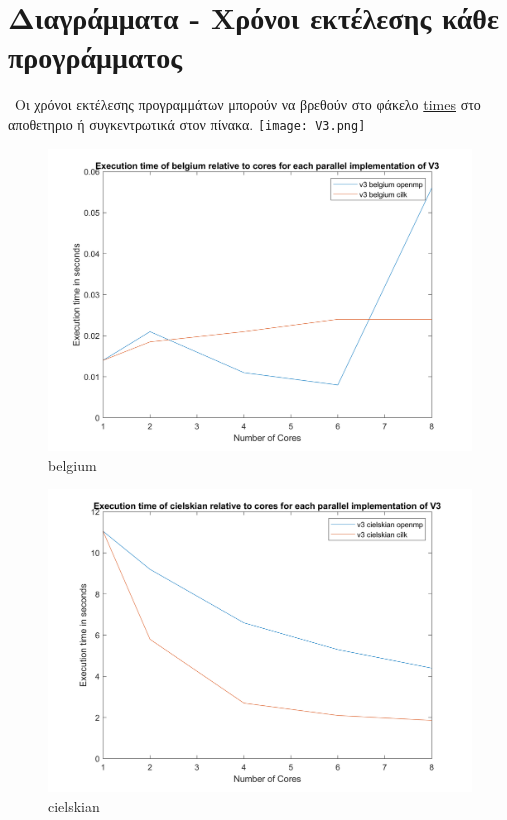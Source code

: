 \documentclass[10pt]{report}
\begin{document}
\section{\color{black} Διαγράμματα - Χρόνοι εκτέλεσης κάθε προγράμματος}\
Οι χρόνοι εκτέλεσης προγραμμάτων μπορούν να βρεθούν στο φάκελο \href{https://github.com/harryfilis/Parallel_and_Distributed_Systems_Assignments/tree/master/Vertexwise_triangle_counting-asgmt1/times}{times} στο αποθετηριο ή συγκεντρωτικά στον πίνακα.
\texttt{[image: V3.png]}
\begin{figure}[h]
\includegraphics[scale=0.5]{belgium_v3.png}
\centering
\caption{belgium}
\end{figure}
\begin{figure}[h]
\centering
\includegraphics[scale=0.5]{cielskian_v3.png}
\caption{cielskian}
\end{figure}
\end{document}
